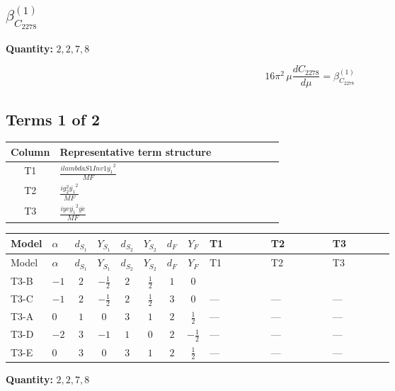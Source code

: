\documentclass[8pt]{article}
\begin{document}
\begin{landscape}
\section*{$\beta_{C_{2278}}^{(1)}$}
\noindent\textbf{Quantity: }$\mathrm{2,2,7,8}$\par\smallskip
\[16\pi^2\,\mu\frac{d C_{2278}}{d\mu}=\beta_{C_{2278}}^{(1)}\]
\subsection*{Terms 1 of 2}
\begin{center}
\begin{tabular}{@{}c >{\raggedright\arraybackslash}p{0.82\linewidth}@{}}
\toprule
Column & Representative term structure \\
\midrule
T1 & \(\displaystyle \frac{i lambdaS1Inv1 \overline{y_{1}}^{2}}{MF}\) \\
\midrule
T2 & \(\displaystyle \frac{i g_{2}^{2} \overline{y_{1}}^{2}}{MF}\) \\
\midrule
T3 & \(\displaystyle \frac{i ye \overline{y_{1}}^{2} \overline{ye}}{MF}\) \\
\midrule
\bottomrule
\end{tabular}
\end{center}
\smallskip
\tiny
\begin{longtable}{@{}llcccccc >{\raggedright\arraybackslash}p{0.21\linewidth} >{\raggedright\arraybackslash}p{0.21\linewidth} >{\raggedright\arraybackslash}p{0.21\linewidth}@{}}
\toprule
Model & $\alpha$ & $d_{S_1}$ & $Y_{S_1}$ & $d_{S_2}$ & $Y_{S_2}$ & $d_F$ & $Y_F$ & T1 & T2 & T3 \\
\midrule
\endfirsthead
\toprule
Model & $\alpha$ & $d_{S_1}$ & $Y_{S_1}$ & $d_{S_2}$ & $Y_{S_2}$ & $d_F$ & $Y_F$ & T1 & T2 & T3 \\
\midrule
\endhead
T3-B & $-1$ & $2$ & $-\frac{1}{2}$ & $2$ & $\frac{1}{2}$ & $1$ & $0$ & \scriptsize\adjustbox{max width=\linewidth}{$\begin{gathered} \frac{i lambdaS1Inv1 \overline{y_{1}}^{2}}{2 MF}\end{gathered}$} & \scriptsize\adjustbox{max width=\linewidth}{$\begin{gathered} \frac{3 i g_{2}^{2} \overline{y_{1}}^{2}}{4 MF}\end{gathered}$} & \scriptsize\adjustbox{max width=\linewidth}{$\begin{gathered} - \frac{i ye \overline{y_{1}}^{2} \overline{ye}}{4 MF}\end{gathered}$} \\
\midrule
T3-C & $-1$ & $2$ & $-\frac{1}{2}$ & $2$ & $\frac{1}{2}$ & $3$ & $0$ & --- & --- & --- \\
\midrule
T3-A & $0$ & $1$ & $0$ & $3$ & $1$ & $2$ & $\frac{1}{2}$ & --- & --- & --- \\
\midrule
T3-D & $-2$ & $3$ & $-1$ & $1$ & $0$ & $2$ & $-\frac{1}{2}$ & --- & --- & --- \\
\midrule
T3-E & $0$ & $3$ & $0$ & $3$ & $1$ & $2$ & $\frac{1}{2}$ & --- & --- & --- \\
\midrule
\bottomrule
\end{longtable}
\clearpage
\noindent\textbf{Quantity: }$\mathrm{2,2,7,8}$\par\smallskip

\end{landscape}
\end{document}
